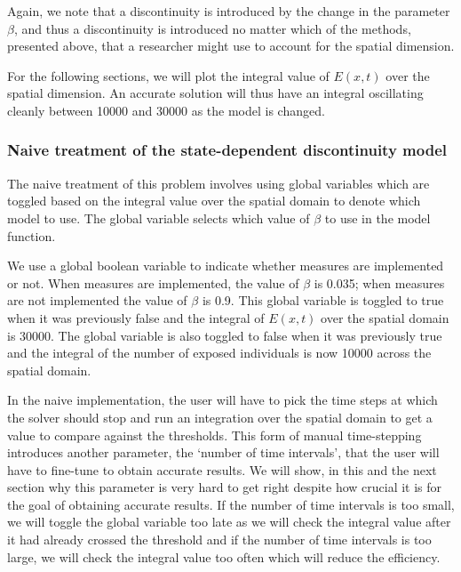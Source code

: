 \documentclass{article}
\begin{document}
Again, we note that a discontinuity is introduced by the change in the parameter $\beta$, and thus a discontinuity is introduced no matter which of the methods, presented above, that a researcher might use to account for the spatial dimension.

For the following sections, we will plot the integral value of $E(x, t)$ over the spatial dimension. An accurate solution will thus have an integral oscillating cleanly between 10000 and 30000 as the model is changed.

\subsubsection{Naive treatment of the state-dependent discontinuity model}
\label{subsubsection:pde_state_naive}
The naive treatment of this problem involves using global variables which are toggled based on the integral value over the spatial domain to denote which model to use. The global variable selects which value of $\beta$ to use in the model function.

We use a global boolean variable to indicate whether measures are implemented or not. When measures are implemented, the value of $\beta$ is 0.035; when measures are not implemented the value of $\beta$ is 0.9. This global variable is toggled to true when it was previously false and the integral of $E(x, t)$ over the spatial domain is 30000. The global variable is also toggled to false when it was previously true and the integral of the number of exposed individuals is now 10000 across the spatial domain. 

In the naive implementation, the user will have to pick the time steps at which the solver should stop and run an integration over the spatial domain to get a value to compare against the thresholds. This form of manual time-stepping introduces another parameter, the `number of time intervals', that the user will have to fine-tune to obtain accurate results. We will show, in this and the next section why this parameter is very hard to get right despite how crucial it is for the goal of obtaining accurate results. If the number of time intervals is too small, we will toggle the global variable too late as we will check the integral value after it had already crossed the threshold and if the number of time intervals is too large, we will check the integral value too often which will reduce the efficiency. 
\end{document}
